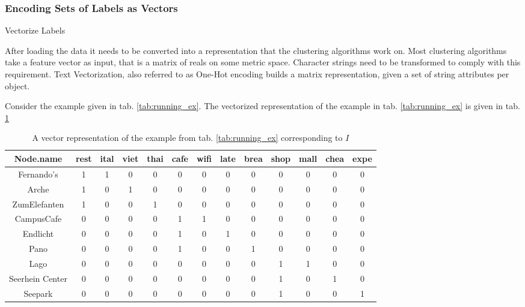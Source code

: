 \subsubsection{Encoding Sets of Labels as Vectors}
\begin{algorithm}[htp]
\caption{Vectorize Labels}\label{vect}
\end{algorithm} 
After loading the data it needs to be converted into a representation that the clustering algorithms work on. Most clustering algorithms take a feature vector as input, that is a matrix of reals on some metric space. Character strings need to be transformed to comply with this requirement. Text Vectorization, also referred to as One-Hot encoding builds a matrix representation, given a set of string attributes per object.

Consider the example given in tab. \ref{tab:running_ex}. The vectorized representation of the example in tab. \ref{tab:running_ex} is given in tab. \ref{tab:vect_running_ex}
\begin{table}[htp]
     \centering
     \begin{tabular}{|c|c|c|c|c|c|c|c|c|c|c|c|c|} \hline
            Node.name & rest & ital & viet & thai & cafe & wifi & late & brea & shop & mall & chea & expe \\ \hline \hline
            Fernando's      & 1 & 1 & 0 & 0 & 0 & 0 & 0 & 0 & 0 & 0 & 0 & 0  \\  \hline
            Arche           & 1 & 0 & 1 & 0 & 0 & 0 & 0 & 0 & 0 & 0 & 0 & 0  \\  \hline
            ZumElefanten    & 1 & 0 & 0 & 1 & 0 & 0 & 0 & 0 & 0 & 0 & 0 & 0  \\ \hline
            CampusCafe      & 0 & 0 & 0 & 0 & 1 & 1 & 0 & 0 & 0 & 0 & 0 & 0 \\ \hline
            Endlicht        & 0 & 0 & 0 & 0 & 1 & 0 & 1 & 0 & 0 & 0 & 0 & 0 \\ \hline
            Pano            & 0 & 0 & 0 & 0 & 1 & 0 & 0 & 1 & 0 & 0 & 0 & 0 \\ \hline
            Lago            & 0 & 0 & 0 & 0 & 0 & 0 & 0 & 0 & 1 & 1 & 0 & 0 \\ \hline
            Seerhein Center & 0 & 0 & 0 & 0 & 0 & 0 & 0 & 0 & 1 & 0 & 1 & 0 \\ \hline
            Seepark         & 0 & 0 & 0 & 0 & 0 & 0 & 0 & 0 & 1 & 0 & 0 & 1\\ \hline
        \end{tabular}
    \caption{A vector representation of the example from tab. \ref{tab:running_ex} corresponding to $I$}
    \label{tab:vect_running_ex}
\end{table}{} \\


